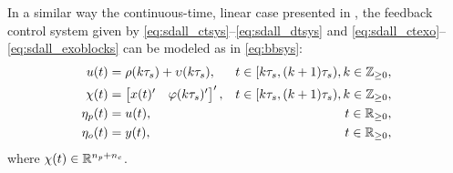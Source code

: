 \begin{remark}
  In a similar way the continuous-time, linear case presented in , the feedback control system given by \eqref{eq:sdall_ctsys}--\eqref{eq:sdall_dtsys} and \eqref{eq:sdall_ctexo}--\eqref{eq:sdall_exoblocks} can be modeled as in \eqref{eq:bbsys}:
  \begin{subequations}
    \label{eq:sdall_bb}
    \begin{align}
      u(t) &= \rho(k\tau_s) + \upsilon(k\tau_s), & t\in [k\tau_s,(k+1)\tau_s), k\in\mathbb{Z}_{\geq 0},\\
      \chi(t) &= \begin{bmatrix}x(t)' & \varphi(k\tau_s)'\end{bmatrix}', & t\in [k\tau_s,(k+1)\tau_s), k\in\mathbb{Z}_{\geq 0},\\
      \eta_p(t) &= u(t), & t\in\mathbb{R}_{\geq 0},\\
      \eta_o(t) &= y(t), & t\in\mathbb{R}_{\geq 0},
    \end{align}
  \end{subequations}
  where $\chi(t)\in\mathbb{R}^{{n_p} + {n_c}}$.\closeremark
\end{remark}


